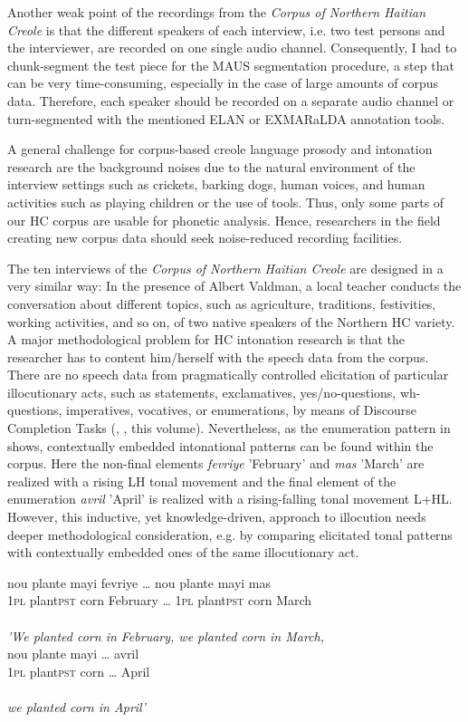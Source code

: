 \documentclass[output=paper]{langsci/langscibook}
\begin{document}
Another weak point of the recordings from the \textit{Corpus of Northern Haitian Creole} is that the different speakers of each interview, i.e. two test persons and the interviewer, are recorded on one single audio channel. Consequently, I had to chunk-segment the test piece for the MAUS segmentation procedure, a step that can be very time-consuming, especially in the case of large amounts of corpus data. Therefore, each speaker should be recorded on a separate audio channel or turn-segmented with the mentioned ELAN or EXMARaLDA annotation tools. 

A general challenge for corpus-based creole language prosody and intonation research are the background noises due to the natural environment of the interview settings such as crickets, barking dogs, human voices, and human activities such as playing children or the use of tools. Thus, only some parts of our HC corpus are usable for phonetic analysis. Hence, researchers in the field creating new corpus data should seek noise-reduced recording facilities.

The ten interviews of the \textit{Corpus of Northern Haitian Creole} are designed in a very similar way: In the presence of Albert Valdman, a local teacher conducts the conversation about different topics, such as agriculture, traditions, festivities, working activities, and so on, of two native speakers of the Northern HC variety. A major methodological problem for HC intonation research is that the researcher has to content him/herself with the speech data from the corpus. There are no speech data from pragmatically controlled elicitation of particular illocutionary acts, such as statements, exclamatives, yes/no-questions, wh-questions, imperatives, vocatives, or enumerations, by means of Discourse Completion Tasks (\citealt{Prieto.2001,Prieto2010,Jun2014,frotaPrieto2015,Prieto2010.2014.Atlas}, \citeauthor{Vanrell.2018}, this volume). Nevertheless, as the enumeration pattern in  shows, contextually embedded intonational patterns can be found within the corpus. Here the non-final elements \textit{fevriye} 'February' and \textit{mas} 'March' are realized with a rising LH tonal movement and the final element of the enumeration \textit{avril} 'April' is realized with a rising-falling tonal movement L+HL. However, this inductive, yet knowledge-driven, approach to illocution needs deeper methodological consideration, e.g. by comparing elicitated tonal patterns with contextually embedded ones of the same illocutionary act.


\ea\label{ex:kal:3}
\gll nou      plante             mayi  fevriye …   nou          plante             mayi  mas\\
1\textsc{pl}  plant\textsc{pst}  corn  February …  1\textsc{pl}  plant\textsc{pst}  corn  March\\
\\
\textit{'We planted corn in February, we planted corn in March,}\\
\gll nou  plante  mayi … avril\\
1\textsc{pl}  plant\textsc{pst}  corn … April\\
\\
\textit{we planted corn in April'}\\
\z
\end{document}
